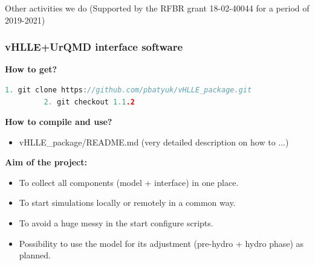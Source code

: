 \documentclass[dvipsnames] {beamer}
\begin{document}
        \begin{frame}
          \frametitle{}
          \bf
          \begin{center}
            \Huge {Other activities we do
             (Supported by the RFBR grant 18-02-40044 for a period of 2019-2021)}
            
          \end{center}
        \end{frame}

        \begin{frame}[fragile]
  \bf
  \frametitle{\bf \centering vHLLE+UrQMD interface software}
  \begin{block}{\bf \centering \color{darkred!70!black} How to get?}
    \scriptsize
       \begin{lstlisting}[language=C++,basicstyle=\ttfamily,keywordstyle=\color{darkred!70!black}]
         1. git clone https://github.com/pbatyuk/vHLLE_package.git
         2. git checkout 1.1.2
       \end{lstlisting}
  \end{block}
  \begin{block}{\bf \centering \color{darkred!70!black} How to compile and use?}
    \begin{itemize}
      \item vHLLE\_package/README.md (very detailed description on how to ...) 
    \end{itemize}
  \end{block}
   \begin{block}{\bf \centering \color{darkred!70!black} Aim of the project:}
     \begin{itemize}
     \item To collect all components (model + interface) in one place.
    \item To start simulations locally or remotely in a common way.
    \item To avoid a huge messy in the start configure scripts.
      \item {\color {darkblue!70!black} Possibility to use the model for its adjustment (pre-hydro + hydro phase)} as planned.
    \end{itemize}
  \end{block}
\end{frame}
\end{document}
